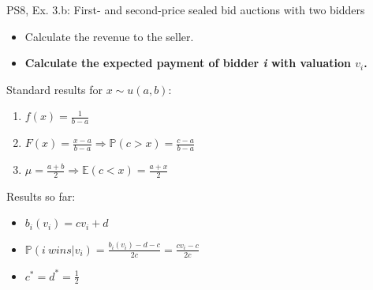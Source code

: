 \begin{frame}{PS8, Ex. 3.b: First- and second-price sealed bid auctions with two bidders}
    \begin{multicols}{2}
      \begin{itemize}
        \item[(b)] Calculate the revenue to the seller.
        \item[\nth{1} step:] \textbf{Calculate the expected payment of bidder \textit{i} with valuation $v_i$.}
      \end{itemize}
      \vfill\null\columnbreak
      Standard results for $x\sim u(a, b):$
      \vspace{-6pt}
      \begin{enumerate}
        \item[PDF:] $f(x)=\frac{1}{b-a}$
        \item[CDF:] $F(x)=\frac{x-a}{b-a}\Rightarrow\mathbb{P}(c>x)=\frac{c-a}{b-a}$
        \item[Mean:] $\mu=\frac{a+b}{2}\Rightarrow\mathbb{E}(c<x)=\frac{a+x}{2}$
      \end{enumerate}
      \vspace{-6pt}
      Results so far:
      \vspace{-6pt}
      \begin{itemize}
        \item[($*$)]  $b_i(v_i) = cv_i+d$
        \item[($**$)] $\mathbb{P}(i\ wins|v_i)=\frac{b_i(v_i)-d-c}{2c}=\frac{cv_i-c}{2c}$
        \item[(3.a)]    $c^*=d^*=\frac{1}{2}$
      \end{itemize}
      \vfill\null
    \end{multicols}
\end{frame}

